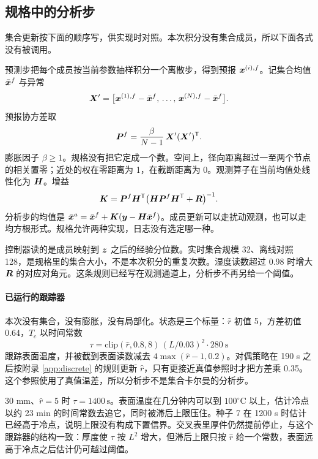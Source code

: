 \subsection{规格中的分析步}

集合更新按下面的顺序写，供实现时对照。本次积分没有集合成员，所以下面各式没有被调用。

预测步把每个成员按当前参数抽样积分一个离散步，得到预报 \(\bm{x}^{(i),f}\)。记集合均值 \(\bar{\bm{x}}^{f}\) 与异常
\[
\bm{X}'=\big[\bm{x}^{(1),f}-\bar{\bm{x}}^{f},\,\ldots,\,\bm{x}^{(N),f}-\bar{\bm{x}}^{f}\big].
\]
预报协方差取
\begin{equation}
\label{eq:enkf}
\bm{P}^{f}=\frac{\beta}{N-1}\,\bm{X}'(\bm{X}')^{\mathsf T}.
\end{equation}
膨胀因子 \(\beta\ge 1\)。规格没有把它定成一个数。空间上，径向距离超过一至两个节点的相关置零；近处的权在零距离为 1，在截断距离为 0。观测算子在当前均值处线性化为 \(\bm{H}\)。增益
\[
\bm{K}=\bm{P}^{f}\bm{H}^{\mathsf T}
\big(\bm{H}\bm{P}^{f}\bm{H}^{\mathsf T}+\bm{R}\big)^{-1}.
\]
分析步的均值是 \(\bar{\bm{x}}^{a}=\bar{\bm{x}}^{f}+\bm{K}(\bm{y}-\bm{H}\bar{\bm{x}}^{f})\)。成员更新可以走扰动观测，也可以走均方根形式。规格允许两种实现，日志没有选定哪一种。

控制器读的是成员映射到 \(\bm{z}\) 之后的经验分位数。实时集合规模 32、离线对照 128，是规格里的集合大小，不是本次积分的重复次数。湿度读数超过 0.98 时增大 \(\bm{R}\) 的对应对角元。这条规则已经写在观测通道上，分析步不再另给一个阈值。

\paragraph{已运行的跟踪器}
本次没有集合，没有膨胀，没有局部化。状态是三个标量：\(\hat r\) 初值 5，方差初值 0.64，\(\hat T_c\) 以时间常数
\begin{equation}
\tau=\mathrm{clip}(\hat r,0.8,8)\,(L/0.03)^2\cdot 280\ \mathrm{s}
\end{equation}
跟踪表面温度，并被截到表面读数减去 \(4\max(\hat r-1,0.2)\)。对偶策略在 190 s 之后按附录 \ref{app:discrete} 的规则更新 \(\hat r\)，只有更接近真值参照时才把方差乘 0.35。这个参照使用了真值温差，所以分析步不是集合卡尔曼的分析步。

30 mm、\(\hat r=5\) 时 \(\tau=1400\,\mathrm{s}\)。表面温度在几分钟内可以到 \(100^\circ\mathrm{C}\) 以上，估计冷点以约 23 min 的时间常数去追它，同时被滞后上限压住。种子 7 在 1200 s 时估计已经高于冷点，说明上限没有构成下置信界。交叉表里厚件仍然提前停止，与这个跟踪器的结构一致：厚度使 \(\tau\) 按 \(L^2\) 增大，但滞后上限只按 \(\hat r\) 给一个常数，表面远高于冷点之后估计仍可越过阈值。


